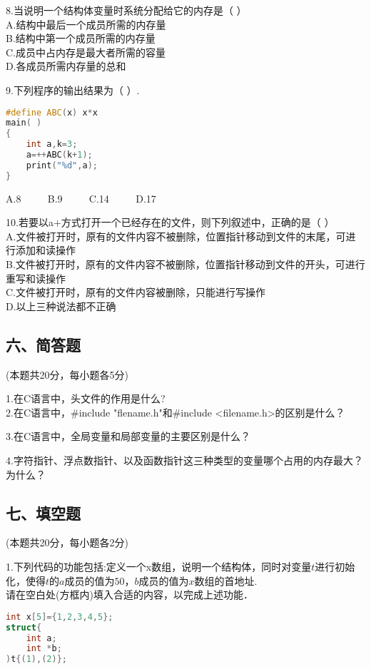 8.当说明一个结构体变量时系统分配给它的内存是（    ）  \\
A.结构中最后一个成员所需的内存量 \\
B.结构中第一个成员所需的内存量 \\
C.成员中占内存是最大者所需的容量 \\
D.各成员所需内存量的总和

9.下列程序的输出结果为（    ）. \\
\begin{lstlisting}[language=cpp]
#define ABC(x) x*x
main( )
{
    int a,k=3;
    a=++ABC(k+1);
    print("%d",a);
}
\end{lstlisting}
A.8 $\qquad$ B.9 $\qquad$ C.14 $\qquad$ D.17

10.若要以a+方式打开一个已经存在的文件，则下列叙述中，正确的是（    ） \\
A.文件被打开时，原有的文件内容不被删除，位置指针移动到文件的末尾，可进行添加和读操作 \\
B.文件被打开时，原有的文件内容不被删除，位置指针移动到文件的开头，可进行重写和读操作 \\
C.文件被打开时，原有的文件内容被删除，只能进行写操作 \\
D.以上三种说法都不正确

\subsection{六、简答题}
(本题共20分，每小题各5分)

1.在C语言中，头文件的作用是什么? \\
2.在C语言中，#include "flename.h"和#include <filename.h>的区别是什么？

3.在C语言中，全局变量和局部变量的主要区别是什么？

4.字符指针、浮点数指针、以及函数指针这三种类型的变量哪个占用的内存最大？为什么？

\subsection{七、填空题}
(本题共20分，每小题各2分)

1.下列代码的功能包括:定义一个x数组，说明一个结构体，同时对变量$t$进行初始化，使得$t$的$a$成员的值为$50$，$b$成员的值为$x$数组的首地址. \\
请在空白处(方框内)填入合适的内容，以完成上述功能．
\begin{lstlisting}[language=cpp]
int x[5]={1,2,3,4,5};
struct{
    int a;
    int *b;
)t{(1),(2)};
\end{lstlisting}

